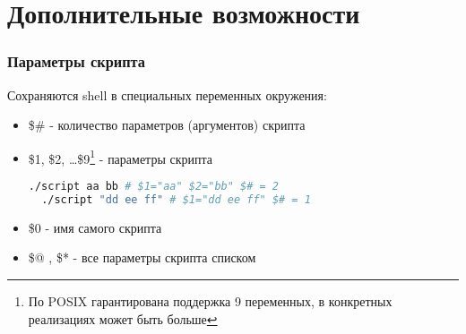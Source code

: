 \section{Дополнительные возможности}

\begin{frame}[fragile]
  \frametitle{Параметры скрипта}

  Сохраняются shell в специальных переменных окружения:
  \begin{itemize}
    \item \alert{\$\#} - количество параметров (аргументов) скрипта
    \item \alert{\$1, \$2, \ldots \$9}\footnote{По POSIX гарантирована поддержка 9 переменных, в конкретных реализациях может быть больше} - параметры скрипта
\begin{lstlisting}[language=sh,frame=single,basicstyle=\normalsize,breaklines=false]
  ./script aa bb # $1="aa" $2="bb" $# = 2
  ./script "dd ee ff" # $1="dd ee ff" $# = 1
\end{lstlisting} \pause
    \item \alert{\$0} - имя самого скрипта
    \item \alert{\$@ , \$*} - все параметры скрипта списком 
  \end{itemize}

\end{frame}



